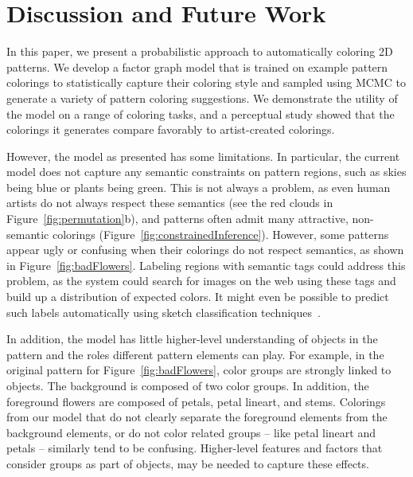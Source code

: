 \section{Discussion and Future Work}
\label{sec:discussion}

In this paper, we present a probabilistic approach to automatically coloring 2D patterns. We develop a factor graph model that is trained on example pattern colorings to statistically capture their coloring style and sampled using MCMC to generate a variety of pattern coloring suggestions. We demonstrate the utility of the model on a range of coloring tasks, and a perceptual study showed that the colorings it generates compare favorably to artist-created colorings.

However, the model as presented has some limitations. In particular, the current model does not capture any semantic constraints on pattern regions, such as skies being blue or plants being green. This is not always a problem, as even human artists do not always respect these semantics (see the red clouds in Figure~\ref{fig:permutation}b), and patterns often admit many attractive, non-semantic colorings (Figure~\ref{fig:constrainedInference}). However, some patterns appear ugly or confusing when their colorings do not respect semantics, as shown in Figure~\ref{fig:badFlowers}. Labeling regions with semantic tags could address this problem, as the system could search for images on the web using these tags and build up a distribution of expected colors. It might even be possible to predict such labels automatically using sketch classification techniques~\cite{SketchClassification}.~ 

In addition, the model has little higher-level understanding of objects in the pattern and the roles different pattern elements can play. For example, in the original pattern for Figure~\ref{fig:badFlowers}, color groups are strongly linked to objects. The background is composed of two color groups. In addition, the foreground flowers are composed of petals, petal lineart, and stems. Colorings from our model that do not clearly separate the foreground elements from the background elements, or do not color related groups -- like petal lineart and petals -- similarly tend to be confusing. Higher-level features and factors that consider groups as part of objects, may be needed to capture these effects.~

